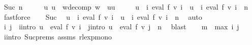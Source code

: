 \begin{isabellebody}
\ {\isacharparenleft}{\kern0pt}Suc\ n{\isacharparenright}{\kern0pt}\isanewline
\ \ \isamarkupfalse%
\ \isamarkupfalse%
\ u\ u{\isacharprime}{\kern0pt}\ \ w{\isacharunderscore}{\kern0pt}decomp{\isacharcolon}{\kern0pt}\ {\isachardoublequoteopen}w\ {\isacharequal}{\kern0pt}\ u{\isacharat}{\kern0pt}u{\isacharprime}{\kern0pt}{\isachardoublequoteclose}\ \isanewline
\ \ \ \ {\isachardoublequoteopen}u\ {\isasymin}\ {\isacharparenleft}{\kern0pt}{\isasymUnion}i{\isachardot}{\kern0pt}\ eval\ f\ {\isacharparenleft}{\kern0pt}v\ i{\isacharparenright}{\kern0pt}{\isacharparenright}{\kern0pt}\ {\isasymand}\ u{\isacharprime}{\kern0pt}\ {\isasymin}\ {\isacharparenleft}{\kern0pt}{\isasymUnion}i{\isachardot}{\kern0pt}\ eval\ f\ {\isacharparenleft}{\kern0pt}v\ i{\isacharparenright}{\kern0pt}{\isacharparenright}{\kern0pt}\ {\isacharcircum}{\kern0pt}{\isacharcircum}{\kern0pt}\ n{\isachardoublequoteclose}\ \isamarkupfalse%
\ fastforce\isanewline
\ \ \isamarkupfalse%
\ Suc\ \isamarkupfalse%
\ {\isachardoublequoteopen}u\ {\isasymin}\ {\isacharparenleft}{\kern0pt}{\isasymUnion}i{\isachardot}{\kern0pt}\ eval\ f\ {\isacharparenleft}{\kern0pt}v\ i{\isacharparenright}{\kern0pt}{\isacharparenright}{\kern0pt}\ {\isasymand}\ u{\isacharprime}{\kern0pt}\ {\isasymin}\ {\isacharparenleft}{\kern0pt}{\isasymUnion}i{\isachardot}{\kern0pt}\ eval\ f\ {\isacharparenleft}{\kern0pt}v\ i{\isacharparenright}{\kern0pt}\ {\isacharcircum}{\kern0pt}{\isacharcircum}{\kern0pt}\ n{\isacharparenright}{\kern0pt}{\isachardoublequoteclose}\ \isamarkupfalse%
\ auto\isanewline
\ \ \isamarkupfalse%
\ \isamarkupfalse%
\ i\ j\ \ i{\isacharunderscore}{\kern0pt}intro{\isacharcolon}{\kern0pt}\ {\isachardoublequoteopen}u\ {\isasymin}\ eval\ f\ {\isacharparenleft}{\kern0pt}v\ i{\isacharparenright}{\kern0pt}{\isachardoublequoteclose}\ \ j{\isacharunderscore}{\kern0pt}intro{\isacharcolon}{\kern0pt}\ {\isachardoublequoteopen}u{\isacharprime}{\kern0pt}\ {\isasymin}\ eval\ f\ {\isacharparenleft}{\kern0pt}v\ j{\isacharparenright}{\kern0pt}\ {\isacharcircum}{\kern0pt}{\isacharcircum}{\kern0pt}\ n{\isachardoublequoteclose}\ \isamarkupfalse%
\ blast\isanewline
\ \ \isamarkupfalse%
\ {\isacharquery}{\kern0pt}m\ {\isacharequal}{\kern0pt}\ {\isachardoublequoteopen}max\ i\ j{\isachardoublequoteclose}\isanewline
\ \ \isamarkupfalse%
\ i{\isacharunderscore}{\kern0pt}intro\ Suc{\isachardot}{\kern0pt}prems{\isacharparenleft}{\kern0pt}{}{\isacharparenright}{\kern0pt}\ assms{\isacharparenleft}{\kern0pt}{}{\isacharparenright}{\kern0pt}\ rlexp{\isacharunderscore}{\kern0pt}mono\ \isamarkupfalse%

\end{isabellebody}
